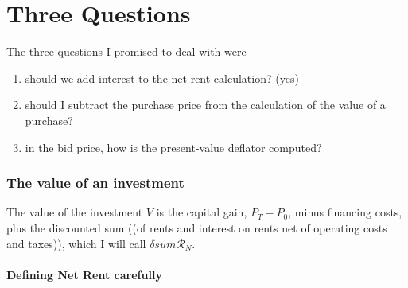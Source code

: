 


\chapter{Three Questions}

The three questions I promised to deal with were
\begin{enumerate}
    \item should we add interest to the net rent calculation? (yes)
    \item should I subtract the purchase price from the calculation of the value of a purchase?
    \item in the bid price, how is the present-value deflator computed?
\end{enumerate}

\subsection{The value of an investment}
The value of the investment $V$ is  the capital gain, $P_{T}-P_{0}$, minus financing costs, plus the discounted sum ((of rents and interest on rents net of operating costs and taxes)), which I will call $\delta sum\mathcal{R}_N$.  

\subsubsection{Defining Net Rent carefully}

